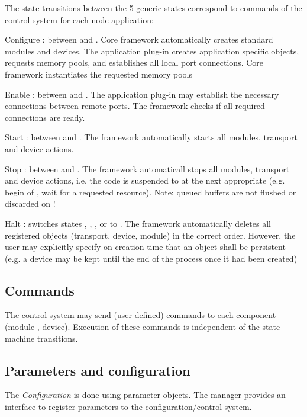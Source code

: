 The state transitions between the 5 generic states correspond to 
      commands of the control system for each node application:
\begin{compactdesc}
\item[Configure] : between  and . Core 
	 framework automatically creates standard modules and 
	 devices. The application plug-in  creates application 
	 specific objects, requests memory pools, and establishes all 
	 local port connections. Core framework instantiates the 
	 requested memory pools
\item[Enable] : between  and . 
	 The application plug-in may establish the necessary 
	 connections between remote ports. The framework checks if 
	 all required connections are ready.
\item[Start]  : between  and . The framework automatically 
	 starts all modules, transport and device actions.
\item[Stop] : between  and . The framework automaticall 
	 stops all modules, transport and device actions, 
	 i.e. the code is suspended to  at the next appropriate 
	  (e.g. begin of , wait for a requested resource). 
	 Note: queued buffers are not flushed or discarded on  !
\item[Halt] : switches states  ,  , , or 
	  to . The framework automatically deletes all 
	 registered objects (transport, device, module) 
	 in the correct order. However, the user may explicitly specify on 
	 creation time that an object shall be persistent (e.g. a device may 
	 be kept until the end of the process once it had been created) 
\end{compactdesc}


\subsection{Commands}
The control system may send (user defined) commands to each 
   component (module , device). Execution of these commands is 
   independent of the state machine transitions.
\subsection{Parameters and configuration}
The {\sl Configuration} is done using parameter objects. The 
   manager provides an interface to register parameters to the
    configuration/control system.    

